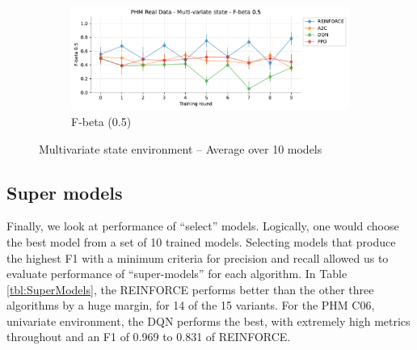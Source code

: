 \documentclass[a4paper, 12pt]{article}
\begin{document}
\begin{figure}[!htbp]
	\begin{subfigure}{\textwidth}
		\centering
		\includegraphics[width=\linewidth]{Multivariate_F05.pdf}  
		\caption{F-beta (0.5)}
		\label{fig:tr-ms-f05}
	\end{subfigure}
	\caption{Multivariate state environment -- Average over 10 models}
	\label{fig:tr-ms-env}
\end{figure}

\subsection{Super models}
Finally, we look at performance of ``select'' models. Logically, one would choose the best model from a set of 10 trained models. Selecting models that produce the highest F1 with a minimum criteria for precision and recall allowed us to evaluate performance of ``super-models'' for each algorithm. In Table \ref{tbl:SuperModels}, the REINFORCE performs better than the other three algorithms by a huge margin, for 14 of the 15 variants. For the PHM C06, univariate environment, the DQN performs the best, with extremely high metrics throughout and an F1 of 0.969 to 0.831 of REINFORCE.
\end{document}
